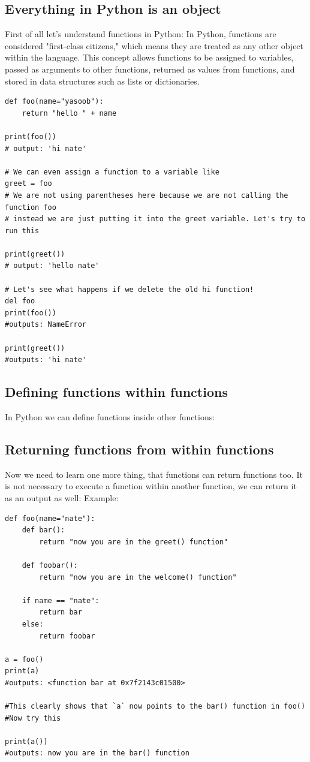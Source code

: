 \documentclass{report}
\begin{document}
    \subsection{Everything in Python is an object}
    \bigbreak \noindent
    First of all let’s understand functions in Python:
    \bigbreak \noindent
    In Python, functions are considered "first-class citizens," which means they are treated as any other object within the language. This concept allows functions to be assigned to variables, passed as arguments to other functions, returned as values from functions, and stored in data structures such as lists or dictionaries.
    \begin{verbatim}
def foo(name="yasoob"):
    return "hello " + name

print(foo())
# output: 'hi nate'

# We can even assign a function to a variable like
greet = foo
# We are not using parentheses here because we are not calling the function foo
# instead we are just putting it into the greet variable. Let's try to run this

print(greet())
# output: 'hello nate'

# Let's see what happens if we delete the old hi function!
del foo
print(foo())
#outputs: NameError

print(greet())
#outputs: 'hi nate'
    \end{verbatim}

    \subsection{Defining functions within functions}
    \bigbreak \noindent
    In Python we can define functions inside other functions:

    \subsection{Returning functions from within functions}
    \bigbreak \noindent
    Now we need to learn one more thing, that functions can return functions too.
    \bigbreak \noindent
    It is not necessary to execute a function within another function, we can return it as an output as well:
    \bigbreak \noindent
    Example:
    \begin{verbatim}
def foo(name="nate"):
    def bar():
        return "now you are in the greet() function"

    def foobar():
        return "now you are in the welcome() function"

    if name == "nate":
        return bar
    else:
        return foobar

a = foo()
print(a)
#outputs: <function bar at 0x7f2143c01500>

#This clearly shows that `a` now points to the bar() function in foo()
#Now try this

print(a())
#outputs: now you are in the bar() function
    \end{verbatim}
\end{document}
